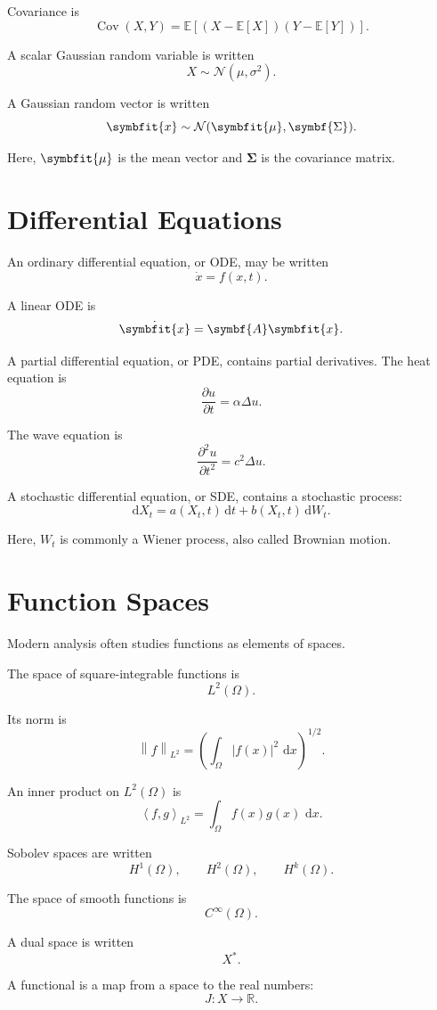 \documentclass[11pt,twocolumn]{article}
\newcommand{\R}{\mathbb{R}}
\newcommand{\vct}[1]{\symbfit{#1}}   %
\newcommand{\mat}[1]{\symbf{#1}}     %
\newcommand{\norm}[1]{\left\lVert #1 \right\rVert}
\newcommand{\abs}[1]{\left\lvert #1 \right\rvert}
\newcommand{\inner}[2]{\left\langle #1, #2 \right\rangle}
\newcommand{\dd}{\,\mathrm{d}}
\newcommand{\pdv}[2]{\frac{\partial #1}{\partial #2}}
\newcommand{\pdvtwo}[2]{\frac{\partial^2 #1}{\partial #2^2}}
\newcommand{\laplace}{\Delta}
\newcommand{\E}{\mathbb{E}}
\newcommand{\Cov}{\operatorname{Cov}}
\newcommand{\Normal}{\mathcal{N}}
\newcommand{\ito}{\mathrm{d}}
\begin{document}
Covariance is
\[
\Cov(X,Y)
=
\E\left[(X-\E[X])(Y-\E[Y])\right].
\]

A scalar Gaussian random variable is written
\[
X \sim \Normal(\mu,\sigma^2).
\]

A Gaussian random vector is written
\[
\vct{x}
\sim
\Normal(\vct{\mu},\mat{\Sigma}).
\]

Here, \(\vct{\mu}\) is the mean vector and \(\mat{\Sigma}\) is the covariance
matrix.

\section{Differential Equations}

An ordinary differential equation, or ODE, may be written
\[
\dot{x}
=
f(x,t).
\]

A linear ODE is
\[
\dot{\vct{x}}
=
\mat{A}\vct{x}.
\]

A partial differential equation, or PDE, contains partial derivatives.
The heat equation is
\[
\pdv{u}{t}
=
\alpha \laplace u.
\]

The wave equation is
\[
\pdvtwo{u}{t}
=
c^2 \laplace u.
\]

A stochastic differential equation, or SDE, contains a stochastic process:
\[
\ito X_t
=
a(X_t,t)\,\ito t
+
b(X_t,t)\,\ito W_t.
\]

Here, \(W_t\) is commonly a Wiener process, also called Brownian motion.

\section{Function Spaces}

Modern analysis often studies functions as elements of spaces.

The space of square-integrable functions is
\[
L^2(\Omega).
\]

Its norm is
\[
\norm{f}_{L^2}
=
\left(
\int_{\Omega}
\abs{f(x)}^2\,\dd x
\right)^{1/2}.
\]

An inner product on \(L^2(\Omega)\) is
\[
\inner{f}{g}_{L^2}
=
\int_{\Omega}
f(x)g(x)\,\dd x.
\]

Sobolev spaces are written
\[
H^1(\Omega),
\qquad
H^2(\Omega),
\qquad
H^k(\Omega).
\]

The space of smooth functions is
\[
C^\infty(\Omega).
\]

A dual space is written
\[
X^*.
\]

A functional is a map from a space to the real numbers:
\[
J:X\to\R.
\]
\end{document}
